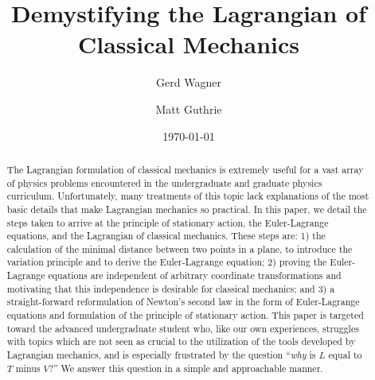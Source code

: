 \documentclass[prb,preprint]{revtex4-1}
\begin{document}

\title{Demystifying the Lagrangian of Classical Mechanics} %

\author{Gerd Wagner}
\email{} %

\author{Matt Guthrie}


\date{\today}

\begin{abstract} %
The Lagrangian formulation of classical mechanics is extremely useful for a vast array of physics problems encountered in the undergraduate and graduate physics curriculum. Unfortunately, many treatments of this topic lack explanations of the most basic details that make Lagrangian mechanics so practical. In this paper, we detail the steps taken to arrive at the principle of stationary action, the Euler-Lagrange equations, and the Lagrangian of classical mechanics. These steps are: 1) the calculation of the minimal distance between two points in a plane, to introduce the variation principle and to derive the Euler-Lagrange equation; 2) proving the Euler-Lagrange equations are independent of arbitrary coordinate transformations and motivating that this independence is desirable for classical mechanics; and 3) a straight-forward reformulation of Newton's second law in the form of Euler-Lagrange equations and formulation of the principle of stationary action. This paper is targeted toward the advanced undergraduate student who, like our own experiences, struggles with topics which are not seen as crucial to the utilization of the tools developed by Lagrangian mechanics, and is especially frustrated by the question ``\textit{why} is $L$ equal to $T$ minus $V$?'' We answer this question in a simple and approachable manner.
\end{abstract}  
\end{document}
